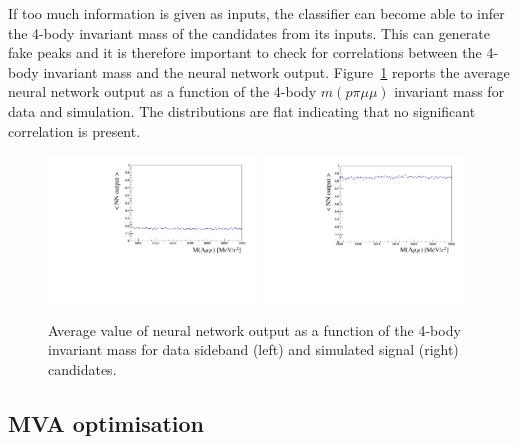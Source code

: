 If too much information is given as inputs, the classifier can become able to infer
 the 4-body invariant mass of the candidates from its inputs.
This can generate fake peaks and it is therefore important to check
for correlations between the 4-body invariant mass and the neural network output.
Figure~\ref{fig:Lb_NNprofiles} reports the average neural network output as a function of
the 4-body $m(p\pi\mu\mu)$ invariant mass for data and simulation. The distributions
are flat indicating that no significant correlation is present.
%
\begin{figure}
\centering
\includegraphics[width=0.49\textwidth]{Lmumu/figs/NNout_profile_vs_LbMM_bkgData.pdf}
\includegraphics[width=0.49\textwidth]{Lmumu/figs/NNout_profile_vs_LbMM_MCsignal.pdf}
\caption{Average value of neural network output as a function of the 4-body invariant mass 
for data sideband (left) and simulated signal (right) candidates.}
\label{fig:Lb_NNprofiles}
\end{figure}








\subsection{MVA optimisation}
\label{sec:Lb_mva_opt}

